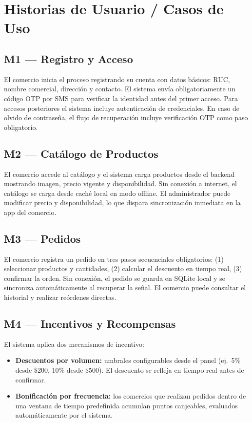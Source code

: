 \documentclass[12pt, a4paper]{report}
\begin{document}
\section{Historias de Usuario / Casos de Uso}

\subsection{M1 — Registro y Acceso}

El comercio inicia el proceso registrando su cuenta con datos básicos: RUC, nombre comercial, dirección y contacto. El sistema envía obligatoriamente un código OTP por SMS para verificar la identidad antes del primer acceso. Para accesos posteriores el sistema incluye autenticación de credenciales. En caso de olvido de contraseña, el flujo de recuperación incluye verificación OTP como paso obligatorio.

\subsection{M2 — Catálogo de Productos}

El comercio accede al catálogo y el sistema carga productos desde el backend mostrando imagen, precio vigente y disponibilidad. Sin conexión a internet, el catálogo se carga desde caché local en modo offline. El administrador puede modificar precio y disponibilidad, lo que dispara sincronización inmediata en la app del comercio.

\subsection{M3 — Pedidos}

El comercio registra un pedido en tres pasos secuenciales obligatorios: (1) seleccionar productos y cantidades, (2) calcular el descuento en tiempo real, (3) confirmar la orden. Sin conexión, el pedido se guarda en SQLite local y se sincroniza automáticamente al recuperar la señal. El comercio puede consultar el historial y realizar reórdenes directas.

\subsection{M4 — Incentivos y Recompensas}

El sistema aplica dos mecanismos de incentivo:

\begin{itemize}
  \item \textbf{Descuentos por volumen:} umbrales configurables desde el panel (ej.\ 5\% desde \$200, 10\% desde \$500). El descuento se refleja en tiempo real antes de confirmar.
  \item \textbf{Bonificación por frecuencia:} los comercios que realizan pedidos dentro de una ventana de tiempo predefinida acumulan puntos canjeables, evaluados automáticamente por el sistema.
\end{itemize}
\end{document}
